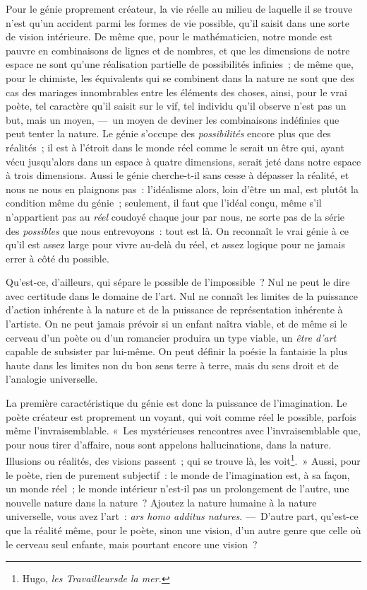 \documentclass[french,twoside]{book} %
\begin{document}
Pour le génie proprement créateur, la vie réelle au milieu de laquelle il se trouve n’est qu’un accident parmi les formes de vie possible, qu’il saisit dans une sorte de vision intérieure. De même que, pour le mathématicien, notre monde est pauvre en combinaisons de lignes et de nombres, et que les dimensions de notre espace ne sont qu’une réalisation partielle de possibilités infinies ; de même que, pour le chimiste, les équivalents qui se combinent dans la nature ne sont que des cas des mariages innombrables entre les éléments des choses, ainsi, pour le vrai poète, tel caractère qu’il saisit sur le vif, tel individu qu’il observe n’est pas un but, mais un moyen, — un moyen de deviner les combinaisons indéfinies que peut tenter la nature. Le génie s’occupe des \emph{possibilités} encore plus que des réalités ; il est à l’étroit dans le monde réel comme le serait un être qui, ayant vécu jusqu’alors dans un espace à quatre dimensions, serait jeté dans notre espace à trois dimensions. Aussi le génie cherche-t-il sans cesse à dépasser la réalité, et nous ne nous en plaignons pas : l’idéalisme alors, loin d’être un mal, est plutôt la condition même du génie ; seulement, il faut que l’idéal conçu, même s’il n’appartient pas au \emph{réel} coudoyé chaque jour par nous, ne sorte pas de la série des \emph{possibles} que nous entrevoyons : tout est là. On reconnaît le vrai génie à ce qu’il est assez large pour vivre au-delà du réel, et assez logique pour ne jamais errer à côté du possible.\par
Qu’est-ce, d’ailleurs, qui sépare le possible de l’impossible ? Nul ne peut le dire avec certitude dans le domaine de l’art. Nul ne connaît les limites de la puissance d’action inhérente à la nature et de la puissance de représentation inhérente à l’artiste. On ne peut jamais prévoir si un enfant naîtra viable, et de même si le cerveau d’un poète ou d’un romancier produira un type viable, un \emph{être d’art} capable de subsister par lui-même. On peut définir la poésie la fantaisie la plus haute dans les limites non du bon sens terre à terre, mais du sens droit et de l’analogie universelle.\par
La première caractéristique du génie est donc la puissance de l’imagination. Le poète créateur est proprement un voyant, qui voit comme réel le possible, parfois même l’invraisemblable. « Les mystérieuses rencontres avec l’invraisemblable que, pour nous tirer d’affaire, nous sont appelons hallucinations, dans la nature. Illusions ou réalités, des visions passent ; qui se trouve là, les voit\footnote{ Hugo, \emph{les Travailleursde la mer.}}. » Aussi, pour le poète, rien de purement subjectif : le monde de l’imagination est, à sa façon, un monde réel ; le monde intérieur n’est-il pas un prolongement de l’autre, une nouvelle nature dans la nature ? Ajoutez la nature humaine à la nature universelle, vous avez l’art : \emph{ars homo additus natures}. — D’autre part, qu’est-ce que la réalité même, pour le poète, sinon une vision, d’un autre genre que celle où le cerveau seul enfante, mais pourtant encore une vision ?\par
\end{document}
